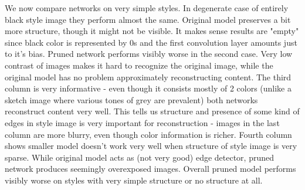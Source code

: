 \documentclass[../Main.tex]{subfiles}
\begin{document}
We now compare networks on very simple styles. In degenerate case of entirely black
style image they perform almost the same. Original model preserves a bit more 
structure, though it might not be visible. It makes sense results are "empty"
since black color is represented by $0$s and the first convolution layer amounts
just to it's bias. Pruned network performs visibly worse in the second case.
Very low contrast of images makes it hard to recognize the original image, while
the original model has no problem approximately reconstructing content. 
The third column is very informative - even though it consists mostly of 2 colors
(unlike a sketch image where various tones of grey are prevalent) both networks
reconstruct content very well. This tells us structure and presence of some kind
of edges in style image is very important for reconstruction - images in the last
column are more blurry, even though color information is richer.
Fourth column shows smaller model  doesn't work very well when structure of style 
image is very sparse. While original model acts as (not very good) edge detector,
pruned network produces seemingly overexposed images.
Overall pruned model performs visibly worse on styles with very simple structure or no
structure at all. 
\end{document}
